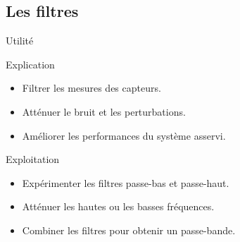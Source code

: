 \subsection{Les filtres}

\begin{frame}{Utilité}
    \begin{block}{Explication}
        
        \begin{itemize}
            \item Filtrer les mesures des capteurs.
            \item Atténuer le bruit et les perturbations.
            \item Améliorer les performances du système asservi.
        \end{itemize}
    \end{block}
    
    \begin{block}{Exploitation}
        
        \begin{itemize}
            \item Expérimenter les filtres passe-bas et passe-haut.
            \item Atténuer les hautes ou les basses fréquences.
            \item Combiner les filtres pour obtenir un passe-bande.
        \end{itemize}
    \end{block}
\end{frame}

